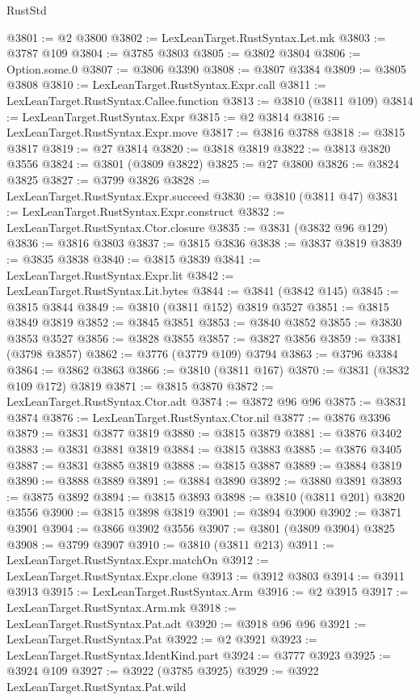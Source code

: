 \begin{lexlean}{RustStd}
\begin{coremodule}
@3801 := @2 @3800
@3802 := LexLeanTarget.RustSyntax.Let.mk
@3803 := @3787 @109
@3804 := @3785 @3803
@3805 := @3802 @3804
@3806 := Option.some.{0}
@3807 := @3806 @3390
@3808 := @3807 @3384
@3809 := @3805 @3808
@3810 := LexLeanTarget.RustSyntax.Expr.call
@3811 := LexLeanTarget.RustSyntax.Callee.function
@3813 := @3810 (@3811 @109)
@3814 := LexLeanTarget.RustSyntax.Expr
@3815 := @2 @3814
@3816 := LexLeanTarget.RustSyntax.Expr.move
@3817 := @3816 @3788
@3818 := @3815 @3817
@3819 := @27 @3814
@3820 := @3818 @3819
@3822 := @3813 @3820 @3556
@3824 := @3801 (@3809 @3822)
@3825 := @27 @3800
@3826 := @3824 @3825
@3827 := @3799 @3826
@3828 := LexLeanTarget.RustSyntax.Expr.succeed
@3830 := @3810 (@3811 @47)
@3831 := LexLeanTarget.RustSyntax.Expr.construct
@3832 := LexLeanTarget.RustSyntax.Ctor.closure
@3835 := @3831 (@3832 @96 @129)
@3836 := @3816 @3803
@3837 := @3815 @3836
@3838 := @3837 @3819
@3839 := @3835 @3838
@3840 := @3815 @3839
@3841 := LexLeanTarget.RustSyntax.Expr.lit
@3842 := LexLeanTarget.RustSyntax.Lit.bytes
@3844 := @3841 (@3842 @145)
@3845 := @3815 @3844
@3849 := @3810 (@3811 @152) @3819 @3527
@3851 := @3815 @3849 @3819
@3852 := @3845 @3851
@3853 := @3840 @3852
@3855 := @3830 @3853 @3527
@3856 := @3828 @3855
@3857 := @3827 @3856
@3859 := @3381 (@3798 @3857)
@3862 := @3776 (@3779 @109) @3794
@3863 := @3796 @3384
@3864 := @3862 @3863
@3866 := @3810 (@3811 @167)
@3870 := @3831 (@3832 @109 @172) @3819
@3871 := @3815 @3870
@3872 := LexLeanTarget.RustSyntax.Ctor.adt
@3874 := @3872 @96 @96
@3875 := @3831 @3874
@3876 := LexLeanTarget.RustSyntax.Ctor.nil
@3877 := @3876 @3396
@3879 := @3831 @3877 @3819
@3880 := @3815 @3879
@3881 := @3876 @3402
@3883 := @3831 @3881 @3819
@3884 := @3815 @3883
@3885 := @3876 @3405
@3887 := @3831 @3885 @3819
@3888 := @3815 @3887
@3889 := @3884 @3819
@3890 := @3888 @3889
@3891 := @3884 @3890
@3892 := @3880 @3891
@3893 := @3875 @3892
@3894 := @3815 @3893
@3898 := @3810 (@3811 @201) @3820 @3556
@3900 := @3815 @3898 @3819
@3901 := @3894 @3900
@3902 := @3871 @3901
@3904 := @3866 @3902 @3556
@3907 := @3801 (@3809 @3904) @3825
@3908 := @3799 @3907
@3910 := @3810 (@3811 @213)
@3911 := LexLeanTarget.RustSyntax.Expr.matchOn
@3912 := LexLeanTarget.RustSyntax.Expr.clone
@3913 := @3912 @3803
@3914 := @3911 @3913
@3915 := LexLeanTarget.RustSyntax.Arm
@3916 := @2 @3915
@3917 := LexLeanTarget.RustSyntax.Arm.mk
@3918 := LexLeanTarget.RustSyntax.Pat.adt
@3920 := @3918 @96 @96
@3921 := LexLeanTarget.RustSyntax.Pat
@3922 := @2 @3921
@3923 := LexLeanTarget.RustSyntax.IdentKind.part
@3924 := @3777 @3923
@3925 := @3924 @109
@3927 := @3922 (@3785 @3925)
@3929 := @3922 LexLeanTarget.RustSyntax.Pat.wild

\end{coremodule}
\end{lexlean}
